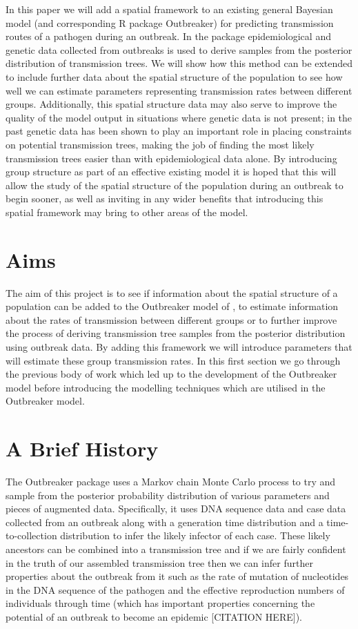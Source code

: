 \documentclass[11pt,a4paper]{report}
\begin{document}
In this paper we will add a spatial framework to an existing general Bayesian model (and corresponding R package Outbreaker) for predicting transmission routes of a pathogen during an outbreak. In the package epidemiological and genetic data collected from outbreaks is used to derive samples from the posterior distribution of transmission trees. We will show how this method can be extended to include further data about the spatial structure of the population to see how well we can estimate parameters representing transmission rates between different groups. Additionally, this spatial structure data may also serve to improve the quality of the model output in situations where genetic data is not present; in the past genetic data has been shown to play an important role in placing constraints on potential transmission trees, making the job of finding the most likely transmission trees easier than with epidemiological data alone. By introducing group structure as part of an effective existing model it is hoped that this will allow the study of the spatial structure of the population during an outbreak to begin sooner, as well as inviting in any wider benefits that introducing this spatial framework may bring to other areas of the model.
\section{Aims}
The aim of this project is to see if information about the spatial structure of a population can be added to the Outbreaker model of \citet{outbrkr}, to estimate information about the rates of transmission between different groups or to further improve the process of deriving transmission tree samples from the posterior distribution using outbreak data. By adding this framework we will introduce parameters that will estimate these group transmission rates. In this first section we go through the previous body of work which led up to the development of the Outbreaker model before introducing the modelling techniques which are utilised in the Outbreaker model.


\section{A Brief History}
The Outbreaker package uses a Markov chain Monte Carlo process to try and sample from the posterior probability distribution of various parameters and pieces of augmented data. Specifically, it uses DNA sequence data and case data collected from an outbreak along with a generation time distribution and a time-to-collection distribution to infer the likely infector of each case. These likely ancestors can be combined into a transmission tree and if we are fairly confident in the truth of our assembled transmission tree then we can infer further properties about the outbreak from it such as the rate of mutation of nucleotides in the DNA sequence of the pathogen and the effective reproduction numbers of individuals through time (which has important properties concerning the potential of an outbreak to become an epidemic [CITATION HERE]).
\end{document}
